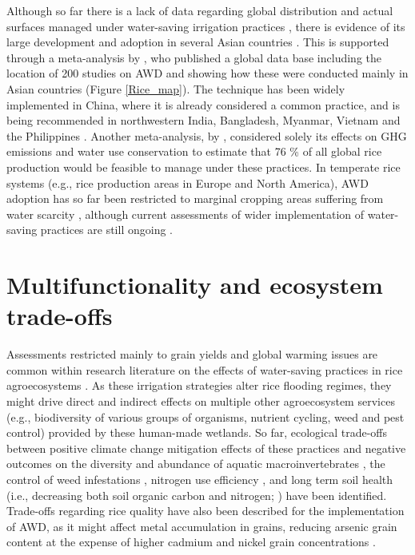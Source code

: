 Although so far there is a lack of data regarding global distribution and actual surfaces managed under water-saving irrigation practices \citep{he2020managing, zhang2023}, there is evidence of its large development and adoption in several Asian countries \citep{lampayan2015}. This is supported through a meta-analysis by \citep{zhang2023}, who published a global data base including the location of 200 studies on AWD and showing how these were conducted mainly in Asian countries (Figure \ref{Rice_map}). The technique has been widely implemented in China, where it is already considered a common practice, and is being recommended in northwestern India, Bangladesh, Myanmar, Vietnam and the Philippines \citep{grisp2013, lampayan2015}. Another meta-analysis, by \cite{bo2022}, considered solely its effects on GHG emissions and water use conservation to estimate that 76 \% of all global rice production would be feasible to manage under these practices. In temperate rice systems (e.g., rice production areas in Europe and North America), AWD adoption has so far been restricted to marginal cropping areas suffering from water scarcity \citep{vitali2024}, although current assessments of wider implementation of water-saving practices are still ongoing \citep{atwill2023, leavitt2023, echeverria-progulakis2025}.\\


\section*{Multifunctionality and ecosystem trade-offs}

Assessments restricted mainly to grain yields and global warming issues are common within research literature on the effects of water-saving practices in rice agroecosystems \citep{vuciterna2024}. As these irrigation strategies alter rice flooding regimes, they might drive direct and indirect effects on multiple other agroecosystem services (e.g., biodiversity of various groups of organisms, nutrient cycling, weed and pest control) provided by these human-made wetlands. So far, ecological trade-offs between positive climate change mitigation effects of these practices and negative outcomes on the diversity and abundance of aquatic macroinvertebrates \citep{watanabe2013}, the control of weed infestations \citep{das2024}, nitrogen use efficiency \citep{cheng2022}, and long term soil health (i.e., decreasing both soil organic carbon and nitrogen; \cite{livsey2019}) have been identified. Trade-offs regarding rice quality have also been described for the implementation of AWD, as it might affect metal accumulation in grains, reducing arsenic grain content at the expense of higher cadmium and nickel grain concentrations \citep{vitali2024}.\\

